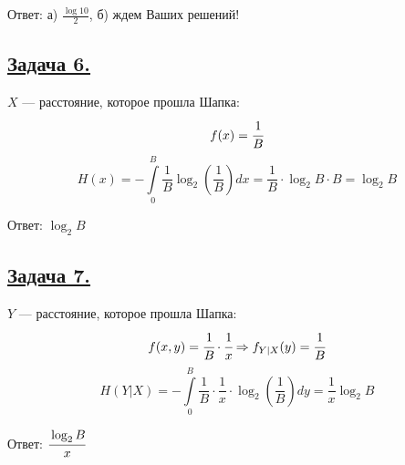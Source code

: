 Ответ: а) $\frac{\log10}{2}$, б) ждем Ваших решений!

\subsection*{\hyperref[sec:problem6]{Задача 6.}}\label{sec:sol_problem6}

$X$ --- расстояние, которое прошла Шапка:
\[f(x)=\cfrac{1}{B}\]
\[H(x)=-\int\limits_{0}^{B}\frac{1}{B}\log_2\left(\frac{1}{B}\right)dx=\frac{1}{B}\cdot \log_2 B\cdot B=\log_2 B\]

Ответ: $\log_2 B$

\subsection*{\hyperref[sec:problem7]{Задача 7.}}\label{sec:sol_problem7}

$Y$ --- расстояние, которое прошла Шапка:
\[f(x, y)=\cfrac{1}{B}\cdot \cfrac{1}{x}\Rightarrow f_{Y|X}(y)=\cfrac{1}{B} \]
\[H(Y|X)=-\int\limits_0^B \frac{1}{B}\cdot \frac{1}{x}\cdot \log_2 \left(\frac{1}{B}\right)dy=\frac{1}{x}\log_2 B \]

Ответ: $\cfrac{\log_2 B}{x}$


